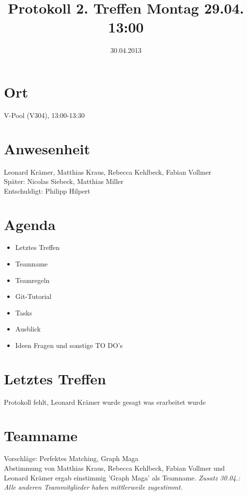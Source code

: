 \documentclass{scrartcl}
\date{30.04.2013}
\title{Protokoll 2. Treffen Montag 29.04. 13:00}
\begin{document}
\maketitle
\section{Ort}
V-Pool (V304), 13:00-13:30
\section{Anwesenheit}

Leonard Krämer, Matthias Kraus, Rebecca Kehlbeck, Fabian Vollmer \\
Später: Nicolas Siebeck, Matthias Miller \\
Entschuldigt: Philipp Hilpert
\section{Agenda}
\begin{itemize}
\item Letztes Treffen
\item Teamname
\item Teamregeln
\item Git-Tutorial
\item Tasks
\item Ausblick
\item Ideen Fragen und sonstige TO DO's
\end{itemize}
\section{Letztes Treffen}
Protokoll fehlt, Leonard Krämer wurde gesagt was erarbeitet wurde
\section{Teamname}
Vorschläge: Perfektes Matching, Graph Maga \\
Abstimmung von Matthias Kraus, Rebecca Kehlbeck, Fabian Vollmer und Leonard Krämer ergab einstimmig 'Graph Maga' als Teamname.
\emph{Zusatz 30.04.: Alle anderen Teammitglieder haben mittlerweile zugestimmt.}
\end{document}
